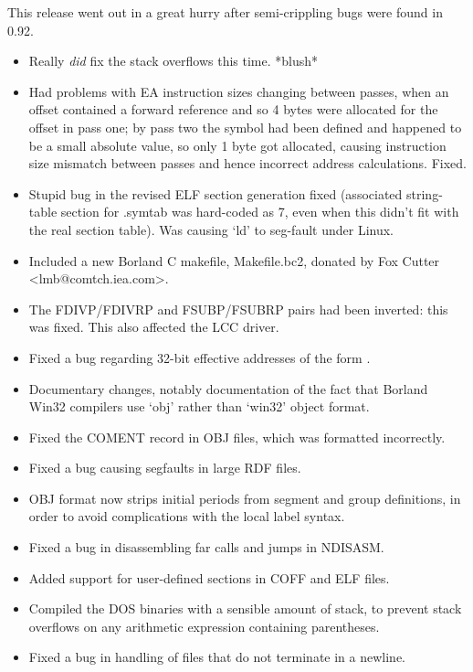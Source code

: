 
This release went out in a great hurry after semi-crippling bugs
were found in 0.92.

\begin{itemize}
    \item{Really \emph{did} fix the stack overflows this time. *blush*}
    \item{Had problems with EA instruction sizes changing between passes, when
        an offset contained a forward reference and so 4 bytes were
        allocated for the offset in pass one; by pass two the symbol had
        been defined and happened to be a small absolute value, so only 1
        byte got allocated, causing instruction size mismatch between passes
        and hence incorrect address calculations. Fixed.}
    \item{Stupid bug in the revised ELF section generation fixed (associated
        string-table section for .symtab was hard-coded as 7, even when this
        didn't fit with the real section table). Was causing `ld' to
        seg-fault under Linux.}
    \item{Included a new Borland C makefile, Makefile.bc2, donated by Fox
        Cutter <lmb@comtch.iea.com>.}
\end{itemize}


\begin{itemize}
    \item{The FDIVP/FDIVRP and FSUBP/FSUBRP pairs had been inverted: this was
        fixed. This also affected the LCC driver.}
    \item{Fixed a bug regarding 32-bit effective addresses of the form
        .}
    \item{Documentary changes, notably documentation of the fact that Borland
        Win32 compilers use `obj' rather than `win32' object format.}
    \item{Fixed the COMENT record in OBJ files, which was formatted
        incorrectly.}
    \item{Fixed a bug causing segfaults in large RDF files.}
    \item{OBJ format now strips initial periods from segment and group
        definitions, in order to avoid complications with the local label
        syntax.}
    \item{Fixed a bug in disassembling far calls and jumps in NDISASM.}
    \item{Added support for user-defined sections in COFF and ELF files.}
    \item{Compiled the DOS binaries with a sensible amount of stack, to
        prevent stack overflows on any arithmetic expression containing
        parentheses.}
    \item{Fixed a bug in handling of files that do not terminate in a newline.}
\end{itemize}

